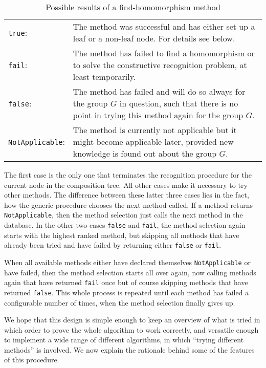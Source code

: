 \begin{table}[ht]
\begin{tabular}{lp{4in}}
\texttt{true}: &
   The method was successful and has either set up a
   leaf or a non-leaf node. For details see below. \\
\texttt{fail}: &
   The method has failed to find a homomorphism or
   to solve the constructive recognition problem, at least temporarily. \\
\texttt{false}: &
   The method has failed and will do so always for
   the group $G$ in question, such that there is no point in trying
   this method again for the group $G$. \\
\texttt{NotApplicable}: &
   The method is currently not applicable
   but it might become applicable later, provided new knowledge is
   found out about the group $G$.
\end{tabular}
\caption{Possible results of a find-homomorphism method}
\label{methselresults}
\end{table}

The first case is the only one that terminates the recognition procedure
for the current node in the composition tree.
All other cases make it necessary to try other methods. The difference
between these latter three cases lies in the fact, how the generic
procedure chooses the next method called. If a method returns
\texttt{NotApplicable}, then the method selection just calls the next
method in the database. In the other two cases \texttt{false} and 
\texttt{fail}, the method selection again starts with the highest ranked
method, but skipping all methods that have already been tried and
have failed by returning either \texttt{false} or \texttt{fail}.

When all available methods either have declared themselves
\texttt{NotApplicable} or have failed, then the method selection 
starts all over again, now calling methods again that have returned
\texttt{fail} once but of course skipping methods that have returned
\texttt{false}. This whole process is repeated until each method has
failed a configurable number of times, when the method selection
finally gives up.

We hope that this design is simple enough to keep an overview of what is
tried in which order to prove the whole algorithm to work correctly,
and versatile enough to implement a wide range of different algorithms,
in which ``trying different methods'' is involved. We now explain
the rationale behind some of the features of this procedure.

